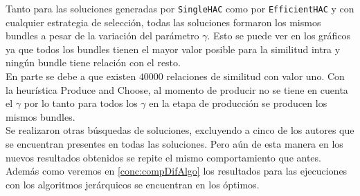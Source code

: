 Tanto para las soluciones generadas por \texttt{SingleHAC} como por \texttt{EfficientHAC} y con 
cualquier estrategia de selección, todas las soluciones formaron los mismos bundles a pesar de la 
variación del parámetro $\gamma$. Esto se puede ver en los gráficos ya que todos los bundles 
tienen el mayor valor posible para la similitud intra y ningún bundle tiene relación con el 
resto.\\
En parte se debe a que existen $40000$ relaciones de similitud con valor uno. Con la 
heurística Produce and Choose, al momento de producir no se tiene en cuenta el $\gamma$ por lo tanto 
para todos los $\gamma$ en la etapa de producción se producen los mismos bundles.\\
Se realizaron otras búsquedas de soluciones, excluyendo a cinco de los autores que se encuentran 
presentes en todas las soluciones. Pero aún de esta manera en los nuevos resultados obtenidos se 
repite el mismo comportamiento que antes.\\
Además como veremos en \ref{conc:compDifAlgo} los resultados para las ejecuciones con los 
algoritmos jerárquicos se encuentran en los óptimos.

